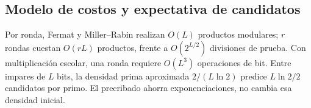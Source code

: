 \subsection{Modelo de costos y expectativa de candidatos}
Por ronda, Fermat y Miller--Rabin realizan $O(L)$ productos modulares; $r$ rondas cuestan $O(rL)$ productos, frente a $O(2^{L/2})$ divisiones de prueba. Con multiplicación escolar, una ronda requiere $O(L^3)$ operaciones de bit. Entre impares de $L$ bits, la densidad prima aproximada $2/(L\ln2)$ predice $L\ln2/2$ candidatos por primo. El precribado ahorra exponenciaciones, no cambia esa densidad inicial.
